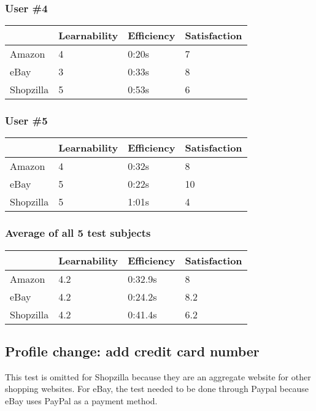\documentclass[11pt, oneside]{article}   	%
\begin{document}
\subsubsection{User \#4}

\begin{tabular}{| l | l | l | l |}
    \hline
     & Learnability & Efficiency & Satisfaction \\ \hline
    Amazon & 4 & 0:20s & 7 \\ \hline
    eBay & 3 & 0:33s & 8 \\ \hline
    Shopzilla & 5 & 0:53s & 6 \\\hline
\end{tabular}

\subsubsection{User \#5}

\begin{tabular}{| l | l | l | l |}
    \hline
     & Learnability & Efficiency & Satisfaction \\ \hline
    Amazon & 4 & 0:32s & 8 \\ \hline
    eBay & 5 & 0:22s & 10 \\ \hline
    Shopzilla & 5 & 1:01s & 4 \\\hline
\end{tabular}

\subsubsection{Average of all 5 test subjects}

\begin{tabular}{| l | l | l | l |}
    \hline
     & Learnability & Efficiency & Satisfaction \\ \hline
    Amazon & 4.2 & 0:32.9s & 8 \\ \hline
    eBay & 4.2 & 0:24.2s & 8.2 \\ \hline
    Shopzilla & 4.2 & 0:41.4s & 6.2 \\\hline
\end{tabular}

\subsection{Profile change: add credit card number}
    
This test is omitted for Shopzilla because they are an aggregate website for other shopping websites. For eBay, the test needed to be done through Paypal because eBay uses PayPal as a payment method.
\end{document}
